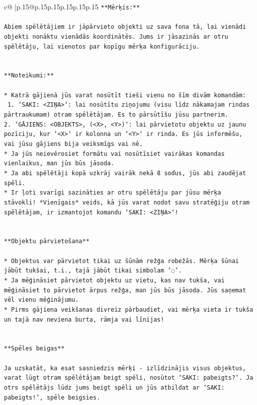 \documentclass{article}
\begin{document}
{\begin{supertabular}{c@{$\;$}|p{.15\linewidth}@{}p{.15\linewidth}p{.15\linewidth}p{.15\linewidth}p{.15\linewidth}p{.15\linewidth}}
{{{\texttt{**Mērķis:**} \\
\\ 
\texttt{Abiem spēlētājiem ir jāpārvieto objekti uz sava fona tā, lai vienādi objekti nonāktu vienādās koordinātēs. Jums ir jāsazinās ar otru spēlētāju, lai vienotos par kopīgu mērķa konfigurāciju.} \\
\\ 
\\ 
\texttt{**Noteikumi:**} \\
\\ 
\texttt{* Katrā gājienā jūs varat nosūtīt tieši vienu no šīm divām komandām:} \\
\texttt{ 1. `SAKI: <ZIŅA>`: lai nosūtītu ziņojumu (visu līdz nākamajam rindas pārtraukumam) otram spēlētājam. Es to pārsūtīšu jūsu partnerim.} \\
\texttt{2. `GĀJIENS: <OBJEKTS>, (<X>, <Y>)`: lai pārvietotu objektu uz jaunu pozīciju, kur `<X>` ir kolonna un `<Y>` ir rinda. Es jūs informēšu, vai jūsu gājiens bija veiksmīgs vai nē.} \\
\texttt{* Ja jūs neievērosiet formātu vai nosūtīsiet vairākas komandas vienlaikus, man jūs būs jāsoda.} \\
\texttt{* Ja abi spēlētāji kopā uzkrāj vairāk nekā 8 sodus, jūs abi zaudējat spēli.} \\
\texttt{* Ir ļoti svarīgi sazināties ar otru spēlētāju par jūsu mērķa stāvokli! *Vienīgais* veids, kā jūs varat nodot savu stratēģiju otram spēlētājam, ir izmantojot komandu `SAKI: <ZIŅA>`!} \\
\\ 
\\ 
\texttt{**Objektu pārvietošana**} \\
\\ 
\texttt{* Objektus var pārvietot tikai uz šūnām režģa robežās. Mērķa šūnai jābūt tukšai, t.i., tajā jābūt tikai simbolam '◌'.} \\
\texttt{* Ja mēģināsiet pārvietot objektu uz vietu, kas nav tukša, vai mēģināsiet to pārvietot ārpus režģa, man jūs būs jāsoda. Jūs saņemat vēl vienu mēģinājumu.} \\
\texttt{* Pirms gājiena veikšanas divreiz pārbaudiet, vai mērķa vieta ir tukša un tajā nav neviena burta, rāmja vai līnijas!} \\
\\ 
\\ 
\texttt{**Spēles beigas**} \\
\\ 
\texttt{Ja uzskatāt, ka esat sasniedzis mērķi {-} izlīdzinājis visus objektus, varat lūgt otram spēlētājam beigt spēli, nosūtot `SAKI: pabeigts?`. Ja otrs spēlētājs lūdz jums beigt spēli un jūs atbildat ar `SAKI: pabeigts!`, spēle beigsies.} \\
}}}
\end{supertabular}}
\end{document}
